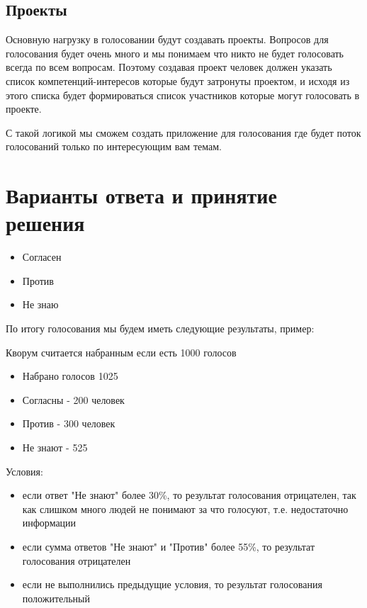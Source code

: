 \documentclass[a4paper,12pt]{report}
\begin{document}
\subsection{Проекты}
Основную нагрузку в голосовании будут создавать проекты. Вопросов для голосования будет очень много и мы понимаем что никто не будет голосовать всегда по всем вопросам. Поэтому создавая проект человек должен указать список компетенций-интересов которые будут затронуты проектом, и исходя из этого списка будет формироваться список участников которые могут голосовать в проекте. 

С такой логикой мы сможем создать приложение для голосования где будет поток голосований только по интересующим вам темам. 

\section{Варианты ответа и принятие решения}

\begin{itemize}
	\item Согласен
	\item Против
	\item Не знаю
\end{itemize}

По итогу голосования мы будем иметь следующие результаты,  пример:\par

Кворум считается набранным если есть 1000 голосов

\begin{itemize}
	\item Набрано голосов 1025
	\item Согласны - 200 человек
	\item Против - 300 человек
	\item Не знают - 525
\end{itemize}


Условия:
\begin{itemize}
	\item если ответ "Не знают" более 30\%, то результат голосования отрицателен, так как слишком много людей не понимают за что голосуют, т.е. недостаточно информации
	\item если сумма ответов "Не знают" и "Против" более 55\%, то результат голосования отрицателен
	\item если не выполнились предыдущие условия, то результат голосования положительный
\end{itemize}
\end{document}
